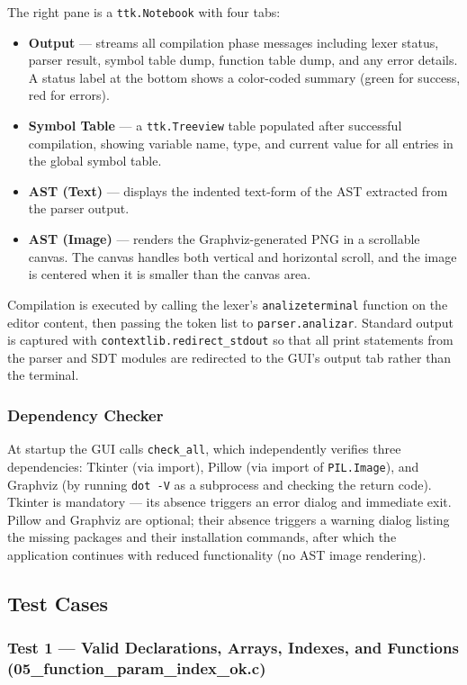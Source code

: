 \documentclass[letterpaper,12pt,oneside]{article}
\begin{document}
The right pane is a \texttt{ttk.Notebook} with four tabs:
\begin{itemize}
    \item \textbf{Output} --- streams all compilation phase messages including lexer status, parser result, symbol table dump, function table dump, and any error details. A status label at the bottom shows a color-coded summary (green for success, red for errors).
    \item \textbf{Symbol Table} --- a \texttt{ttk.Treeview} table populated after successful compilation, showing variable name, type, and current value for all entries in the global symbol table.
    \item \textbf{AST (Text)} --- displays the indented text-form of the AST extracted from the parser output.
    \item \textbf{AST (Image)} --- renders the Graphviz-generated PNG in a scrollable canvas. The canvas handles both vertical and horizontal scroll, and the image is centered when it is smaller than the canvas area.
\end{itemize}
Compilation is executed by calling the lexer's \texttt{analizeterminal} function on the editor content, then passing the token list to \texttt{parser.analizar}. Standard output is captured with \texttt{contextlib.redirect\_stdout} so that all print statements from the parser and SDT modules are redirected to the GUI's output tab rather than the terminal.

\subsubsection{Dependency Checker}
At startup the GUI calls \texttt{check\_all}, which independently verifies three dependencies: Tkinter (via import), Pillow (via import of \texttt{PIL.Image}), and Graphviz (by running \texttt{dot -V} as a subprocess and checking the return code). Tkinter is mandatory --- its absence triggers an error dialog and immediate exit. Pillow and Graphviz are optional; their absence triggers a warning dialog listing the missing packages and their installation commands, after which the application continues with reduced functionality (no AST image rendering).

\subsection{Test Cases}

\subsubsection{Test 1 --- Valid Declarations, Arrays, Indexes, and Functions\\(05\_function\_param\_index\_ok.c)}
\end{document}
